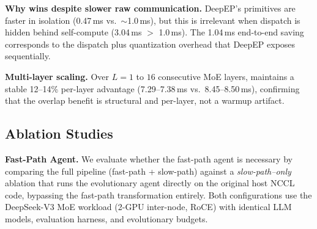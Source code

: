 \noindent\textbf{Why \cufuse{} wins despite slower raw communication.}
DeepEP's primitives are faster in isolation (0.47\,ms vs.\ ${\sim}$1.0\,ms), but this is irrelevant when dispatch is hidden behind self-compute (3.04\,ms $>$ 1.0\,ms). The 1.04\,ms end-to-end saving corresponds to the dispatch plus quantization overhead that DeepEP exposes sequentially.

\noindent\textbf{Multi-layer scaling.}
Over $L{=}1$ to $16$ consecutive MoE layers, \cufuse{} maintains a stable 12--14\% per-layer advantage (7.29--7.38\,ms vs.\ 8.45--8.50\,ms), confirming that the overlap benefit is structural and per-layer, not a warmup artifact.


\vspace{-10pt}
\subsection{Ablation Studies}
\vspace{-10pt}
\label{sec:ablation}
\noindent\textbf{Fast-Path Agent.}
We evaluate whether the fast-path agent is necessary by comparing the full \cufuse{} pipeline (fast-path + slow-path) against a \emph{slow-path--only} ablation that runs the evolutionary agent directly on the original host NCCL code, bypassing the fast-path transformation entirely. Both configurations use the DeepSeek-V3 MoE workload (2-GPU inter-node, RoCE) with identical LLM models, evaluation harness, and evolutionary budgets.


